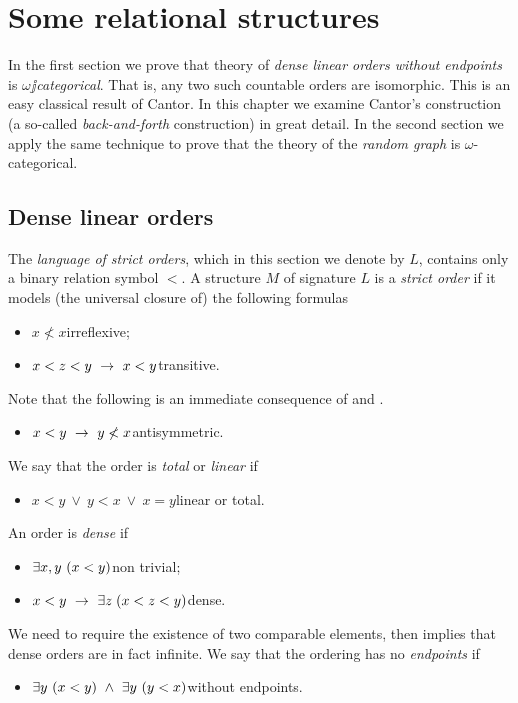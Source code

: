 \documentclass[creche.tex]{subfiles}
\begin{document}
\chapter{Some relational structures}
\label{relational}

\def\ceq#1#2#3{\parbox[b]{20ex}{$\displaystyle #1$}\parbox[b]{4ex}{\hfil$#2$}$\displaystyle #3$}

In the first section we prove that theory of \textit{dense linear orders without endpoints\/} is \textit{$\omega\jj$cate\-gorical}. That is, any two such countable orders are isomorphic.  This is an easy classical result of Cantor. In this chapter we examine Cantor's construction (a so-called \textit{back-and-forth\/} construction) in great detail. In the second section we apply the same technique to prove that the theory of the \textit{random graph\/} is $\omega\mbox{-}$categorical.

\section{Dense linear orders}
\label{dlo}
The \emph{language of strict orders}, which in this section we denote by $L$, contains only a binary relation symbol $<$. A structure $M$ of signature $L$ is a \emph{strict order\/} if it models (the universal closure of) the following formulas
\begin{itemize}
\item[1.] $x \not< x$\hfill irreflexive;
\item[2.] $x< z< y\ \rightarrow\ x< y$\hfill transitive.
\end{itemize}
Note that the following is an immediate consequence of  and .
\begin{itemize}
\item[] $x<y\ \imp\ y\not<x$\hfill antisymmetric.
\end{itemize}
We say that the order is \emph{total\/} or \emph{linear\/} if
\begin{itemize}
\item[li.] $x< y\ \vee\ y< x\ \vee\ x=y$\hfill linear or total.
\end{itemize}
An order is \emph{dense\/} if
\begin{itemize}
\item[nt.]  $\exists x,y\ (x<y)$\hfill non trivial;
\item[d.] $x<y\ \rightarrow\ \exists z\;(x<z<y)$\hfill dense.
\end{itemize}
We need to require the existence of two comparable elements, then  implies that dense orders are in fact infinite. We say that the ordering has no \emph{endpoints\/} if
\begin{itemize}
\item[e.] $\E y\ (x<y)\ \wedge\ \E y\ (y<x)$\hfill without endpoints.
\end{itemize}
\end{document}
